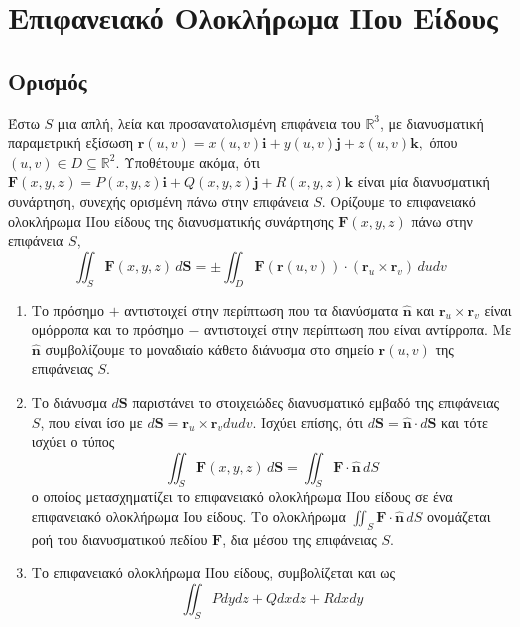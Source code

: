 







\chapter*{Επιφανειακό Ολοκλήρωμα ΙΙου Είδους}

\setcounter{chapter}{1}

\section{Ορισμός}

Έστω $ S $ μια απλή, λεία και προσανατολισμένη επιφάνεια του $ \mathbb{R}^{3} $, 
με διανυσματική παραμετρική εξίσωση $ \mathbf{r}(u,v) =
x(u,v)\mathbf{i}+y(u,v)\mathbf{j}+z(u,v)\mathbf{k}, $ όπου $ (u,v) \in D \subseteq
\mathbb{R}^{2} $. Υποθέτουμε ακόμα, ότι $ \mathbf{F}(x,y,z) =
P(x,y,z)\mathbf{i}+Q(x,y,z)\mathbf{j}+R(x,y,z)\mathbf{k} $ είναι μία διανυσματική 
συνάρτηση, συνεχής ορισμένη πάνω στην επιφάνεια $S$. Ορίζουμε το 
\textcolor{Col1}{επιφανειακό ολοκλήρωμα ΙΙου είδους} της διανυσματικής συνάρτησης 
$ \mathbf{F}(x,y,z) $ πάνω στην επιφάνεια $S$,
\[
  \iint_{S} \mathbf{F}(x,y,z) \, d \mathbf{S}  = \pm \iint_{D} 
  \mathbf{F}(\mathbf{r}(u,v)) \cdot (\mathbf{r}_{u} \times \mathbf{r}_{v}) \, dudv   
\]

\begin{rems}
\item {}
  \begin{enumerate}
    \item Το πρόσημο $ + $ αντιστοιχεί στην περίπτωση που τα διανύσματα 
      $ \mathbf{\widehat{n}} $ και $ \mathbf{r}_{u} \times \mathbf{r}_{v} $ 
      είναι ομόρροπα και το πρόσημο $ - $ αντιστοιχεί στην περίπτωση που είναι 
      αντίρροπα. Με $ \mathbf{\widehat{n}} $ συμβολίζουμε το μοναδιαίο κάθετο διάνυσμα 
      στο σημείο $ \mathbf{r}(u,v) $ της επιφάνειας $S$.
    \item Το διάνυσμα $ d \mathbf{S} $ παριστάνει το στοιχειώδες διανυσματικό εμβαδό 
      της επιφάνειας $S$, που είναι ίσο με $ d \mathbf{S} = \mathbf{r}_{u} \times
      \mathbf{r}_{v} du dv $. Ισχύει επίσης, ότι $ d \mathbf{S} = \mathbf{\widehat{n}}
      \cdot d \mathbf{S} $ και τότε ισχύει ο τύπος 
      \[
        \iint_{S} \mathbf{F}(x,y,z) \, d \mathbf{S} = \iint_{S} \mathbf{F} \cdot
        \mathbf{\widehat{n}} \,{dS}
      \] 
      ο οποίος μετασχηματίζει το επιφανειακό ολοκλήρωμα ΙΙου είδους σε ένα επιφανειακό 
      ολοκλήρωμα Ιου είδους. Το ολοκλήρωμα $ \iint_{S} \mathbf{F}\cdot
      \mathbf{\widehat{n}} \,{dS} $ ονομάζεται \textcolor{Col1}{ροή} του 
      διανυσματικού πεδίου $ \mathbf{F} $, δια μέσου της επιφάνειας $S$.
    \item Το επιφανειακό ολοκλήρωμα ΙΙου είδους, συμβολίζεται και ως 
      \[
        \iint_{S} Pdydz + Qdxdz + Rdxdy 
      \] 
  \end{enumerate}
\end{rems} 

